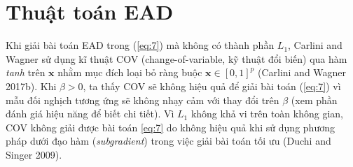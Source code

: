 \section{Thuật toán EAD}
Khi giải bài toán EAD trong (\ref{eq:7}) mà không có thành phần $L_1$, Carlini and Wagner 
sử dụng kĩ thuật COV (change-of-variable, kỹ thuật đổi biến) qua hàm \textit{tanh} trên $\mathbf{x}$ nhằm 
mục đích loại bỏ ràng buộc $\mathbf{x} \in [0,1]^p$ (Carlini and Wagner 2017b). Khi 
$\beta > 0$, ta thấy COV sẽ không hiệu quả để giải bài toán (\ref{eq:7}) vì mẫu đối 
nghịch tương ứng sẽ không nhạy cảm với thay đổi trên $\beta$ (xem phần đánh giá hiệu 
năng để biết chi tiết). Vì $L_1$ không khả vi trên toàn không gian, COV không giải 
được bài toán \ref{eq:7} do không hiệu quả khi sử dụng phương pháp dưới đạo hàm (\textit{subgradient})
trong việc giải bài toán tối ưu (Duchi and Singer 2009). 

